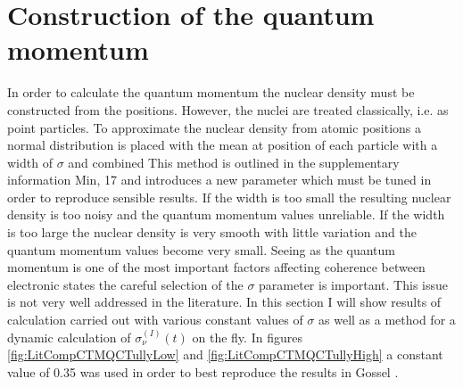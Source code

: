 \section{Construction of the quantum momentum}
\label{sect:SigmaSect}
In order to calculate the quantum momentum the nuclear density must be constructed from the  positions. However, the nuclei are treated classically, i.e. as point particles. To approximate the nuclear density from atomic positions a normal distribution is placed with the mean at  position of each particle with a width of $\sigma$ and combined This method is outlined in the supplementary information  Min, 17 \cite{min_ab_2017} and introduces a new parameter which must be tuned in order to reproduce sensible results. If the width is too small the resulting nuclear density is too noisy and the quantum momentum values unreliable. If the width is too large the nuclear density is very smooth with little variation and the quantum momentum values become very small. Seeing as the quantum momentum is one of the most important factors affecting coherence between electronic states the careful selection of the $\sigma$ parameter is important. This issue is not very well addressed in the literature. In this section I will show results of calculation carried out with various constant values of $\sigma$ as well as a method for a dynamic calculation of $\sigma^{(I)}_{\nu}(t)$ on the fly. In figures \ref{fig:LitCompCTMQCTullyLow} and \ref{fig:LitCompCTMQCTullyHigh} a constant value of 0.35 was used in order to best reproduce the results in Gossel \cite{gossel_coupled-trajectory_2018}.
